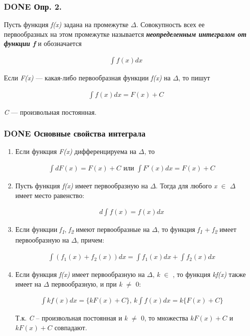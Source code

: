 \documentclass[11pt]{article}
\begin{document}
\subsubsection{{\bfseries\sffamily DONE} Опр. 2.}
\label{sec:org32d2082}
Пусть функция \emph{f(x)} задана на промежутке \(\Delta\). Совокупность всех ее первообразных на этом промежутке называется \emph{\textbf{неопределенным интегралом от функции \emph{f}}} и обозначается

\begin{eqnarray}
\int f(x)dx
\end{eqnarray}

Если \emph{F(x)} — какая-либо первообразная функции \emph{f(x)} на \(\Delta\), то пишут

\begin{eqnarray}
\int f(x)dx=F(x)+C
\end{eqnarray}

\emph{C} — произвольная постоянная.

\subsubsection{{\bfseries\sffamily DONE} Основные свойства интеграла}
\label{sec:orgd96dbb6}
\begin{enumerate}
\item Если функция \emph{F(x)} дифференцируема на \(\Delta\), то
\label{sec:org5f3c388}

\begin{eqnarray}
\int dF(x)=F(x)+C \text{ или }\int F'(x)dx=F(x)+C
\end{eqnarray}

\item Пусть функция \emph{f(x)} имеет первообразную на \(\Delta\). Тогда для любого \emph{x} \(\in\) \(\Delta\) имеет место равенство:
\label{sec:orgb11c91e}

\begin{eqnarray}
d\int f(x)=f(x)dx
\end{eqnarray}

\item Если функции \emph{f\textsubscript{1}}, \emph{f\textsubscript{2}} имеют первообразные на \(\Delta\), то функция \emph{f\textsubscript{1}} + \emph{f\textsubscript{2}} имеет первообразную на \(\Delta\), причем:
\label{sec:orgf15a360}

\begin{eqnarray}
\int(f_1(x) + f_2(x))dx=\int f_1(x)dx + \int f_2(x)dx
\end{eqnarray}

\item Если функция \emph{f(x)} имеет первообразную на \(\Delta\), \emph{k} \(\in\) \emph{\R}, то функция \emph{kf(x)} также имеет на \(\Delta\) первообразную, и при \emph{k} \(\ne\) 0:
\label{sec:org6cb54ed}

\begin{gather*}
\int kf(x)dx=\{kF(x)+C\}\text{, }k\int f(x)dx=k\{F(x)+C\}
\end{gather*}

Т.к. \emph{C} – произвольная постоянная и \emph{k} \(\ne\) 0, то множества \({kF(x) + C}\) и \(k{F(x) + C}\) совпадают.
\end{enumerate}
\end{document}
